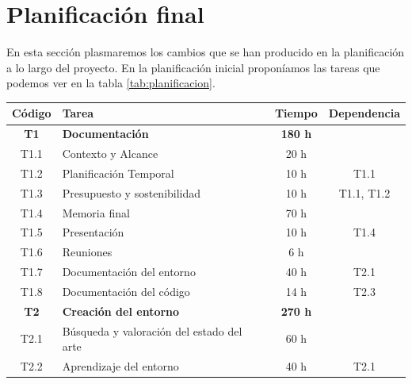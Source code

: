 \chapter{Planificación final}
En esta sección plasmaremos los cambios que se han producido en la planificación a lo largo del proyecto. En la planificación inicial proponíamos las tareas que podemos ver en la tabla \ref {tab:planificacion}.

\begin{table}[h]
	\begin{center}
		\begin{tabular}{| c | l | c | c |}
			\hline
			\textbf{Código} & \textbf{Tarea}                               & \textbf{Tiempo} & \textbf{Dependencia} \\ \hline
			\textbf{T1}     & \textbf{Documentación}                       & \textbf{180 h}  &                      \\ \hline
			T1.1            & Contexto y Alcance                           & 20 h            &                      \\
			T1.2            & Planificación Temporal                       & 10 h            & T1.1                 \\
			T1.3            & Presupuesto y sostenibilidad                 & 10 h            & T1.1, T1.2           \\
			T1.4            & Memoria final                                & 70 h            &                      \\
			T1.5            & Presentación                                 & 10 h            & T1.4                 \\
			T1.6            & Reuniones                                    & 6 h             &                      \\
			T1.7            & Documentación del entorno                    & 40 h            & T2.1                 \\
			T1.8            & Documentación del código                     & 14 h            & T2.3                 \\
			\hline
			\textbf{T2}     & \textbf{Creación del entorno}                & \textbf{270 h}  &                      \\ \hline
			T2.1            & Búsqueda y valoración del estado del arte    & 60 h            &                      \\
			T2.2            & Aprendizaje del entorno                      & 40 h            & T2.1                 \\

\end{tabular}
\end{center}
\end{table}
